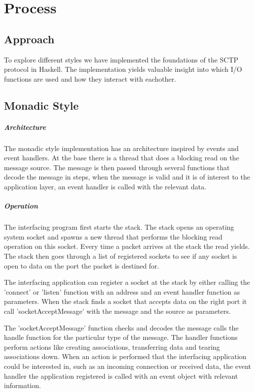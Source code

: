 \chapter{Process}
\section{Approach}
To explore different styles we have implemented the foundations of the SCTP protocol\cite{_rfc_????} in Haskell. The implementation yields valuable insight into which I/O functions are used and how they interact with eachother.
\section{Monadic Style}
\paragraph{Architecture}
The monadic style implementation has an architecture inspired by events and event handlers. At the base there is a thread that does a blocking read on the message source. The message is then passed through several functions that decode the message in steps, when the message is valid and it is of interest to the application layer, an event handler is called with the relevant data.

\paragraph{Operation}
The interfacing program first starts the stack. The stack opens an operating system socket and spawns a new thread that performs the blocking read operation on this socket. Every time a packet arrives at the stack the read yields. The stack then goes through a list of registered sockets to see if any socket is open to data on the port the packet is destined for.

The interfacing application can register a socket at the stack by either calling the 'connect' or 'listen' function with an address and an event handler function as parameters.
When the stack finds a socket that accepts data on the right port it call 'socketAcceptMessage' with the message and the source as parameters.

The 'socketAcceptMessage' function checks and decodes the message calls the handle function for the particular type of the message. The handler functions perform actions like creating associations, transferring data and tearing associations down. When an action is performed that the interfacing application could be interested in, such as an incoming connection or received data, the event handler the application registered is called with an event object with relevant information.

